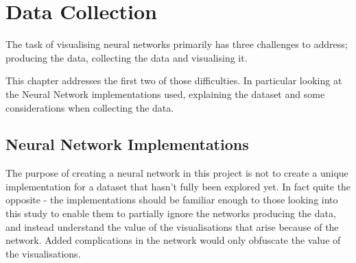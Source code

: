 \documentclass[a4paper,11pt,titlepage]{article}
\begin{document}
\clearpage
\section{Data Collection}
	
	The task of visualising neural networks primarily has three challenges to address; producing the data, collecting the data and visualising it. 
	\par 
	This chapter addresses the first two of those difficulties. In particular looking at the Neural Network implementations used, explaining the dataset and some considerations when collecting the data.
	
	\subsection{Neural Network Implementations}
	The purpose of creating a neural network in this project is not to create a unique implementation for a dataset that hasn't fully been explored yet. In fact quite the opposite - the implementations should be familiar enough to those looking into this study to enable them to partially ignore the networks producing the data, and instead understand the value of the visualisations that arise because of the network. Added complications in the network would only obfuscate the value of the visualisations. 
	
	\begin{figure}[H]
    			\caption{}%
	\end{figure}	
\end{document}
